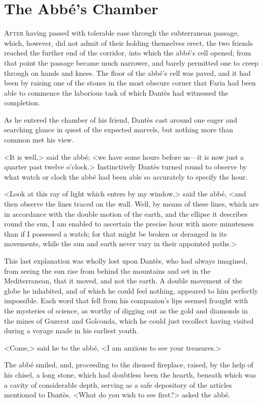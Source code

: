 \chapter{The Abbé's Chamber}

 \lettrine{A}{fter} having passed with tolerable ease through the subterranean passage, which, however, did not admit of their holding themselves erect, the two friends reached the further end of the corridor, into which the abbé's cell opened; from that point the passage became much narrower, and barely permitted one to creep through on hands and knees. The floor of the abbé's cell was paved, and it had been by raising one of the stones in the most obscure corner that Faria had been able to commence the laborious task of which Dantès had witnessed the completion. 

 As he entered the chamber of his friend, Dantès cast around one eager and searching glance in quest of the expected marvels, but nothing more than common met his view. 

 <It is well,> said the abbé; <we have some hours before us—it is now just a quarter past twelve o'clock.> Instinctively Dantès turned round to observe by what watch or clock the abbé had been able so accurately to specify the hour. 

 <Look at this ray of light which enters by my window,> said the abbé, <and then observe the lines traced on the wall. Well, by means of these lines, which are in accordance with the double motion of the earth, and the ellipse it describes round the sun, I am enabled to ascertain the precise hour with more minuteness than if I possessed a watch; for that might be broken or deranged in its movements, while the sun and earth never vary in their appointed paths.> 

 This last explanation was wholly lost upon Dantès, who had always imagined, from seeing the sun rise from behind the mountains and set in the Mediterranean, that it moved, and not the earth. A double movement of the globe he inhabited, and of which he could feel nothing, appeared to him perfectly impossible. Each word that fell from his companion's lips seemed fraught with the mysteries of science, as worthy of digging out as the gold and diamonds in the mines of Guzerat and Golconda, which he could just recollect having visited during a voyage made in his earliest youth. 

 <Come,> said he to the abbé, <I am anxious to see your treasures.> 

 The abbé smiled, and, proceeding to the disused fireplace, raised, by the help of his chisel, a long stone, which had doubtless been the hearth, beneath which was a cavity of considerable depth, serving as a safe depository of the articles mentioned to Dantès.  <What do you wish to see first?> asked the abbé. 

